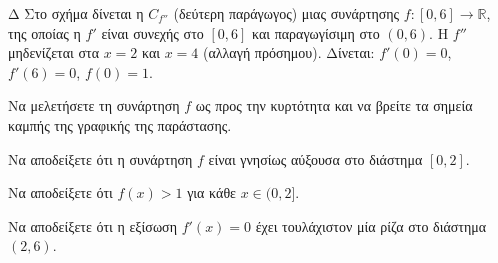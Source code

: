 \begin{thema}{Δ}
Στο σχήμα δίνεται η $C_{f''}$ (δεύτερη παράγωγος) μιας συνάρτησης $f:[0, 6]\to\mathbb{R}$, της οποίας η $f'$ είναι συνεχής στο $[0,6]$ και παραγωγίσιμη στο $(0,6)$. Η $f''$ μηδενίζεται στα $x=2$ και $x=4$ (αλλαγή πρόσημου). Δίνεται: $f'(0) = 0$, $f'(6) = 0$, $f(0) = 1$.

\begin{center}
\end{center}

\begin{erwthma}
  \item Να μελετήσετε τη συνάρτηση $f$ ως προς την κυρτότητα και να βρείτε τα σημεία καμπής της γραφικής της παράστασης.
  \item Να αποδείξετε ότι η συνάρτηση $f$ είναι γνησίως αύξουσα στο διάστημα $[0, 2]$.
  \item Να αποδείξετε ότι $f(x) > 1$ για κάθε $x \in (0, 2]$.
  \item Να αποδείξετε ότι η εξίσωση $f'(x) = 0$ έχει τουλάχιστον μία ρίζα στο διάστημα $(2, 6)$.
\end{erwthma}
\end{thema}


